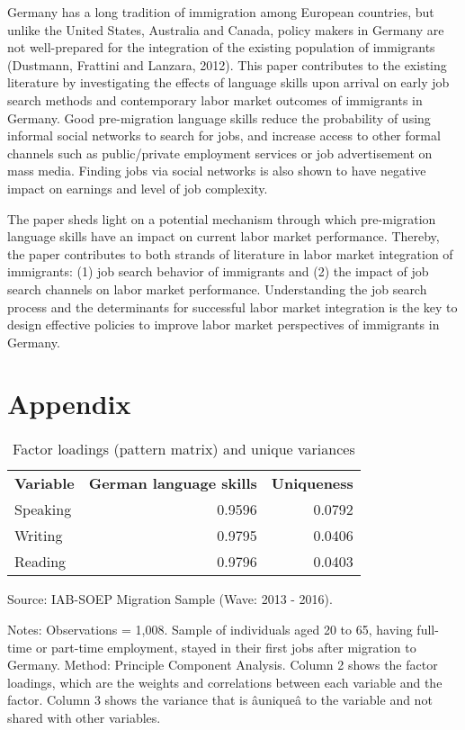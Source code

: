 \documentclass[12pt,a4paper]{article}
\begin{document}
Germany has a long tradition of immigration among European countries, but unlike the United States, Australia and Canada, policy makers in Germany are not well-prepared for the integration of the existing population of immigrants (Dustmann, Frattini and Lanzara, 2012). This paper contributes to the existing literature by investigating the effects of language skills upon arrival on early job search methods and contemporary labor market outcomes of immigrants in Germany. Good pre-migration language skills reduce the probability of using informal social networks to search for jobs, and increase access to other formal channels such as public/private employment services or job advertisement on mass media. Finding jobs via social networks is also shown to have negative impact on earnings and level of job complexity.

The paper sheds light on a potential mechanism through which pre-migration language skills have an impact on current labor market performance. Thereby, the paper contributes to both strands of literature in labor market integration of immigrants: (1) job search behavior of immigrants and (2) the impact of job search channels on labor market performance. Understanding the job search process and the determinants for successful labor market integration is the key to design effective policies to improve labor market perspectives of immigrants in Germany.

\section{Appendix}

\begin{table}[htbp]
  \centering
  \caption{Factor loadings (pattern matrix) and unique variances}
\begin{center}
    \begin{tabular}{lrr}
    \toprule
    \multicolumn{1}{c}{\textbf{Variable}} & \multicolumn{1}{c}{\textbf{German language skills}} & \multicolumn{1}{c}{\textbf{Uniqueness}} \\
    Speaking & 0.9596 & 0.0792 \\
    Writing & 0.9795 & 0.0406 \\
    Reading & 0.9796 & 0.0403 \\
    \bottomrule
    \end{tabular}%
\end{center}
\begin{tablenotes}
      \small
      \item Source: IAB-SOEP Migration Sample (Wave: 2013 - 2016).
      \item Notes: Observations = 1,008. Sample of individuals aged 20 to 65, having full-time or part-time employment, stayed in their first jobs after migration to Germany.  Method: Principle Component Analysis. Column 2 shows the factor loadings, which are the weights and correlations between each variable and the factor. Column 3 shows  the variance that is âuniqueâ to the variable and not shared with other variables.
    \end{tablenotes}
\end{table}%
\end{document}
